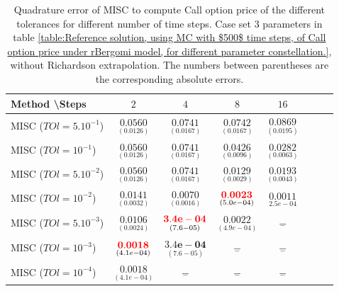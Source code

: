 \documentclass[11pt]{article}
\begin{document}
\begin{table}[h!]
\centering
\begin{tabular}{l*{6}{c}r}
Method \textbackslash  Steps            & $2$ & $4$ & $8$ & $16$  \\
\hline
MISC ($TOl=5.10^{-1}$)  & $\underset{(   0.0126
	)}{\mathbf{    0.0560}}$ & $\underset{(  0.0167
	)}{\mathbf{   0.0741
}}$ & $\underset{(     0.0167
	)}{\mathbf{  0.0742
}}$ & $\underset{(  0.0195)}{\mathbf{   0.0869}}$  \\
MISC ($TOl=10^{-1}$)  &  $\underset{(   0.0126
	)}{\mathbf{    0.0560}}$ & $\underset{(  0.0167
	)}{\mathbf{   0.0741
}}$ & $\underset{(
	0.0096)}{\mathbf{ 0.0426}}$ & $\underset{(0.0063
	)}{\mathbf{  0.0282}}$  \\
MISC ($TOl=5.10^{-2}$)  & $\underset{(   0.0126
	)}{\mathbf{    0.0560}}$& $\underset{(  0.0167
	)}{\mathbf{   0.0741
}}$ & $\underset{(        0.0029
	)}{\mathbf{
		0.0129
}}$ & $\underset{(
	0.0043)}{\mathbf{      0.0193}}$  \\
MISC ($TOl=10^{-2}$)  & $\underset{(  0.0032
	)}{\mathbf{ 0.0141}}$ & $\underset{(
	0.0016)}{\mathbf{  0.0070}}$ & $\underset{(5.0e-04)}{\mathbf{   {\color{red}0.0023}
}}$ & $\underset{2.5e-04
}{\mathbf{0.0011}}$  \\
MISC ($TOl=5.10^{-3}$)  & $\underset{(0.0024)}{\mathbf{ 0.0106}}$ & $\underset{(
	7.6-05)}{\mathbf{  {\color{red}3.4e-04}}}$& $\underset{    (4.9e-04)}{\mathbf{      0.0022
}}$ & $\underset{-}{\mathbf{-}}$  \\
MISC ($TOl=10^{-3}$)  & $\underset{(         4.1e-04
	)}{\mathbf{ 
		{\color{red}	0.0018}
}}$ & $\underset{(
	7.6-05)}{\mathbf{  3.4e-04}}$ & $\underset{-}{\mathbf{-}}$ & $\underset{-}{\mathbf{-}}$  \\
MISC ($TOl=10^{-4}$)  & $\underset{(         4.1e-04
	)}{\mathbf{ 
		0.0018
}}$  & $\underset{-}{\mathbf{-}}$ & $\underset{-}{\mathbf{-}}$ & $\underset{-}{\mathbf{-}}$  \\
\hline
\end{tabular}
\caption{Quadrature error of MISC to compute Call option price of the different tolerances for different number of time steps. Case  set $3$ parameters in table \ref{table:Reference solution, using MC with $500$ time steps, of Call option price under rBergomi model, for different parameter constellation.}, without Richardson extrapolation. The numbers between parentheses are the corresponding absolute errors.}
\label{Quadrature error of MISC to compute Call option price of the different tolerances for different number of time steps. Case  set $3$ parameters, without Richardson extrapolation. The numbers between parentheses are the corresponding absolute errors,linear}
\end{table}
\end{document}
